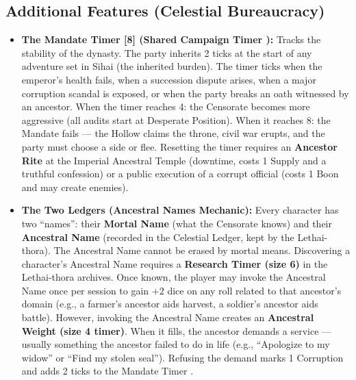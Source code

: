 \subsection*{Additional Features (Celestial Bureaucracy)}
\label{sec:sihai-features}

\begin{itemize}
\item \textbf{The Mandate Timer [8] (Shared Campaign Timer ):} Tracks the stability of the dynasty. The party inherits 2 ticks at the start of any adventure set in Sihai (the inherited burden). The timer ticks when the emperor's health fails, when a succession dispute arises, when a major corruption scandal is exposed, or when the party breaks an oath witnessed by an ancestor. When the timer reaches 4: the Censorate becomes more aggressive (all audits start at Desperate Position). When it reaches 8: the Mandate fails --- the Hollow claims the throne, civil war erupts, and the party must choose a side or flee. Resetting the timer requires an \textbf{Ancestor Rite} at the Imperial Ancestral Temple (downtime, costs 1 Supply and a truthful confession) or a public execution of a corrupt official (costs 1 Boon and may create enemies).

\item \textbf{The Two Ledgers (Ancestral Names Mechanic):} Every character has two ``names'': their \textbf{Mortal Name} (what the Censorate knows) and their \textbf{Ancestral Name} (recorded in the Celestial Ledger, kept by the Lethai-thora). The Ancestral Name cannot be erased by mortal means. Discovering a character's Ancestral Name requires a \textbf{Research Timer (size 6)} in the Lethai-thora archives. Once known, the player may invoke the Ancestral Name once per session to gain $+2$ dice on any roll related to that ancestor's domain (e.g., a farmer's ancestor aids harvest, a soldier's ancestor aids battle). However, invoking the Ancestral Name creates an \textbf{Ancestral Weight (size 4 timer)}. When it fills, the ancestor demands a service --- usually something the ancestor failed to do in life (e.g., ``Apologize to my widow'' or ``Find my stolen seal''). Refusing the demand marks 1 Corruption and adds 2 ticks to the Mandate Timer .


\end{itemize}
